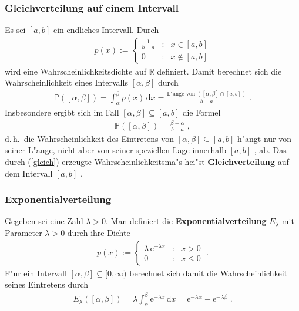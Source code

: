 \documentclass[ngerman,draft,parskip=half,twoside]{scrartcl}
\newcommand*{\R}{\mathbb{R}}      %
\newcommand*{\WKM}{\mathbb{P}}      %
\begin{document}
\subsubsection{Gleichverteilung auf einem Intervall}
Es sei $[a,b]$ ein endliches Intervall. Durch
\begin{gather*}
  p(x):=\left\{
     \begin{array}{ccl}
       \frac{1}{b-a} &\colon& x\in [a,b]\\
       0 &\colon& x\notin [a,b]
     \end{array}
     \right.
\end{gather*}
wird eine Wahrscheinlichkeitsdichte auf $\R$ definiert. Damit berechnet sich die Wahrscheinlichkeit
eines Intervalls $[\alpha,\beta]$ durch
\begin{gather}
\label{gleich}
\WKM([\alpha,\beta])=\int_\alpha^\beta p(x)\,\mathrm dx= \frac{\mbox{L"ange von}\;([\alpha,\beta]\cap[a,b])}
{b-a}\;.
\end{gather}
Insbesondere ergibt sich im Fall $[\alpha,\beta]\subseteq [a,b]$ die Formel
\begin{gather*}
  \WKM([\alpha,\beta])= \frac{\beta-\alpha}{b-a}\;,
\end{gather*}
d.\,h.~die Wahrscheinlichkeit des Eintretens von $[\alpha,\beta]\subseteq[a,b]$
 h"angt nur von seiner L"ange, nicht aber von
seiner speziellen Lage innerhalb $[a,b]$ , ab.
Das durch (\ref{gleich}) erzeugte Wahrscheinlichkeitsma"s hei"st \textbf{Gleichverteilung} auf dem
Intervall $[a,b]$ .
\subsubsection{Exponentialverteilung}
Gegeben sei eine Zahl $\lambda>0$. Man definiert die
\textbf{Exponentialverteilung} $E_\lambda$ mit Parameter $\lambda>0$ durch
ihre Dichte
\begin{gather*}
  p(x):=\left\{
     \begin{array}{ccr}
       \lambda\,\mathrm e^{-\lambda x} &\colon& x>0\\
       0 &\colon& x\le 0
     \end{array}
     \right.\;.
\end{gather*}
F"ur ein Intervall $[\alpha,\beta]\subseteq [0,\infty)$ berechnet sich damit
die Wahrscheinlichkeit seines Eintretens durch
\begin{gather*}
  E_\lambda([\alpha,\beta])=\lambda \int_\alpha^\beta \mathrm e^{-\lambda x}\,\mathrm dx
     = \mathrm e^{-\lambda\alpha}- \mathrm e^{-\lambda\beta}\;.
\end{gather*}
\end{document}
